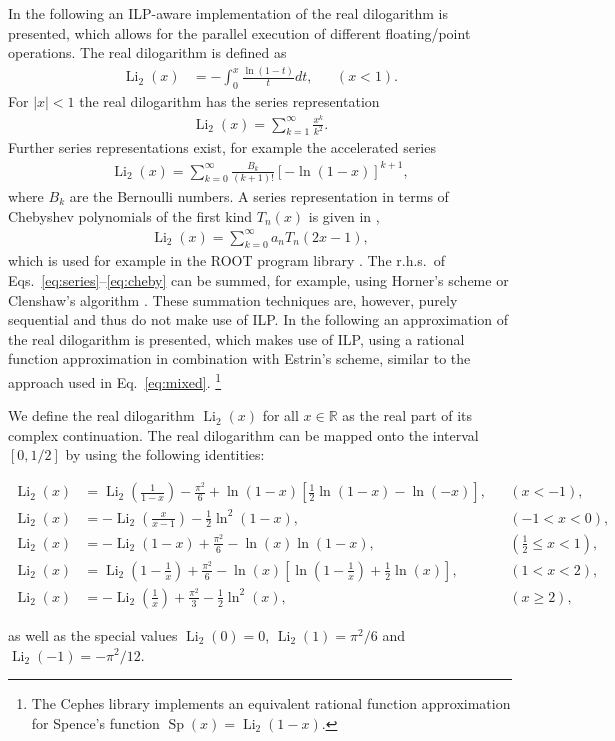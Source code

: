 \documentclass[10pt,DIV16,twocolumn,numbers=noenddot]{scrartcl}
\newcommand{\Li}{\operatorname{Li}_2}
\begin{document}
In the following an ILP-aware implementation of the real dilogarithm
is presented, which allows for the parallel execution of different
floating\-/point operations.  The real dilogarithm is defined as
%
\begin{align}
  \Li(x) &= -\int_0^x \frac{\ln(1-t)}{t}dt, &
  &(x<1).
\end{align}
%
For $|x|<1$ the real dilogarithm has the series representation
%
\begin{align}
  \Li(x) = \sum_{k=1}^\infty \frac{x^k}{k^2}.
  \label{eq:series}
\end{align}
%
Further series representations exist, for example the accelerated
series
%
\begin{align}
  \Li(x) = \sum_{k=0}^\infty \frac{B_k}{(k+1)!} [-\ln(1-x)]^{k+1},
\end{align}
%
where $B_k$ are the Bernoulli numbers.  A series representation in
terms of Chebyshev polynomials of the first kind $T_n(x)$ is given in
\cite{luke},
%
\begin{align}
  \Li(x) = \sum_{k=0}^\infty a_n T_n(2x-1),
  \label{eq:cheby}
\end{align}
%
which is used for example in the ROOT program library \cite{root}.
The r.h.s.\ of Eqs.~\eqref{eq:series}--\eqref{eq:cheby} can be summed,
for example, using Horner's scheme or Clenshaw's algorithm
\cite{clenshaw}.  These summation techniques are, however, purely
sequential and thus do not make use of ILP.  In the following an
approximation of the real dilogarithm is presented, which makes use of
ILP, using a rational function approximation in combination with
Estrin's scheme, similar to the approach used in
Eq.~\eqref{eq:mixed}.%
\footnote{The Cephes library \cite{cephes} implements an equivalent
  rational function approximation for Spence's function
  $\operatorname{Sp}(x)=\Li(1-x)$.}

We define the real dilogarithm $\Li(x)$ for all $x\in\mathbb{R}$ as
the real part of its complex continuation.  The real dilogarithm can
be mapped onto the interval $[0,1/2]$ by using the following
identities:
%
\begin{widetext}%
\begin{align}%
  \Li(x) &= \Li\left(\frac{1}{1-x}\right) - \frac{\pi^2}{6} + \ln(1-x)\left[\frac{1}{2}\ln(1-x) - \ln(-x)\right], && (x<-1), \\
  \Li(x) &= -\Li\left(\frac{x}{x-1}\right) - \frac{1}{2}\ln^2(1-x), && (-1<x<0), \\
  \Li(x) &= -\Li(1-x) + \frac{\pi^2}{6} - \ln(x) \ln(1-x), && (\frac{1}{2}\leq x<1), \\
  \Li(x) &= \Li\left(1-\frac{1}{x}\right) + \frac{\pi^2}{6} - \ln(x)\left[\ln\left(1-\frac{1}{x}\right) + \frac{1}{2}\ln(x)\right], && (1<x<2), \\
  \Li(x) &= -\Li\left(\frac{1}{x}\right) + \frac{\pi^2}{3} - \frac{1}{2} \ln^2(x), && (x\geq 2),%
\end{align}%
\end{widetext}%
%
as well as the special values $\Li(0)=0$, $\Li(1)=\pi^2/6$ and
$\Li(-1)=-\pi^2/12$.
\end{document}
